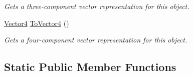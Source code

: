 \begin{DoxyCompactItemize}
\begin{DoxyCompactList}\small\item\em Gets a three-\/component vector representation for this object.\end{DoxyCompactList}\item 
\hyperlink{structMicrosoft_1_1Xna_1_1Framework_1_1Vector4}{Vector4} \hyperlink{structMicrosoft_1_1Xna_1_1Framework_1_1Color_a14cbe31136980519eb62abfc500c3f1b}{To\+Vector4} ()
\begin{DoxyCompactList}\small\item\em Gets a four-\/component vector representation for this object.\end{DoxyCompactList}\end{DoxyCompactItemize}
\subsection*{Static Public Member Functions}
